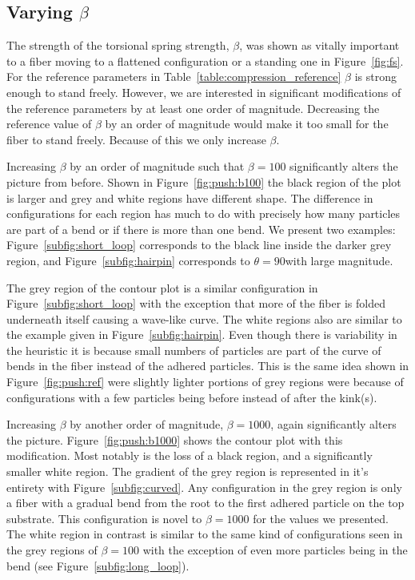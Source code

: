 \subsection{Varying $\beta$}

The strength of the torsional spring strength, $\beta$, was shown as vitally important to a fiber moving to a flattened configuration or a standing one in Figure~\ref{fig:fs}. For the reference parameters in Table~\ref{table:compression_reference} $\beta$ is strong enough to stand freely. However, we are interested in significant modifications of the reference parameters by at least one order of magnitude. Decreasing the reference value of $\beta$ by an order of magnitude would make it too small for the fiber to stand freely. Because of this we only increase $\beta$.

Increasing $\beta$ by an order of magnitude such that $\beta=100$ significantly alters the picture from before. Shown in Figure~\ref{fig:push:b100} the black region of the plot is larger and grey and white regions have different shape. The difference in configurations for each region has much to do with precisely how many particles are part of a bend or if there is more than one bend. We present two examples: Figure~\ref{subfig:short_loop} corresponds to the black line inside the darker grey region, and Figure~\ref{subfig:hairpin} corresponds to $\theta=90$\textdegree with large magnitude.

The grey region of the contour plot is a similar configuration in Figure~\ref{subfig:short_loop} with the exception that more of the fiber is folded underneath itself causing a wave-like curve. The white regions also are similar to the example given in Figure~\ref{subfig:hairpin}. Even though there is variability in the heuristic it is because small numbers of particles are part of the curve of bends in the fiber instead of the adhered particles. This is the same idea shown in Figure~\ref{fig:push:ref} were slightly lighter portions of grey regions were because of configurations with a few particles being before instead of after the kink(s).

Increasing $\beta$ by another order of magnitude, $\beta=1000$, again significantly alters the picture. Figure~\ref{fig:push:b1000} shows the contour plot with this modification. Most notably is the loss of a black region, and a significantly smaller white region. The gradient of the grey region is represented in it's entirety with Figure~\ref{subfig:curved}. Any configuration in the grey region is only a fiber with a gradual bend from the root to the first adhered particle on the top substrate. This configuration is novel to $\beta=1000$ for the values we presented. The white region in contrast is similar to the same kind of configurations seen in the grey regions of $\beta=100$ with the exception of even more particles being in the bend (see Figure~\ref{subfig:long_loop}).

